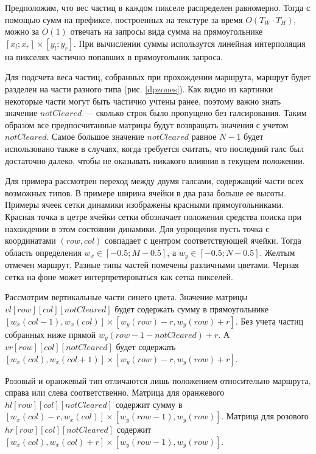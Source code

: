 Предположим, что вес частиц в каждом пикселе распределен равномерно. Тогда с помощью
сумм на префиксе, построенных на текстуре за время $O(T_W \cdot T_H)$, можно за $O(1)$
отвечать на запросы вида сумма на прямоугольнике $[x_l ; x_r] \times [y_l ; y_r]$.
При вычислении суммы использутся линейная интерполяция на пикселях частично попавших
в прямоугольник запроса.


Для подсчета веса частиц, собранных при прохождении маршрута, маршрут будет разделен на
части разного типа (рис. \ref{dpzones}). Как видно из картинки некоторые части могут
быть частично учтены ранее, поэтому важно знать значение $notCleared$ --- сколько строк
было пропущено без галсирования. Таким образом все предпосчитанные матрицы будут возвращать
значения с учетом $notCleared$. Самое большое значение $notCleared$ равное $N-1$ будет
использовано также в случаях, когда требуется считать, что последний галс был
достаточно далеко, чтобы не оказывать никакого влияния в текущем положении.

Для примера рассмотрен переход между двумя галсами, содержащий части всех возможных типов.
В примере ширина ячейки в два раза больше ее высоты. Примеры ячеек сетки динамики 
изображены красными прямоугольниками. Красная точка в цетре 
ячейки сетки обозначает положения средства поиска при нахождении в этом состоянии динамики.
Для упрощения пусть точка с координатами $(row, col)$ совпадает с центром соответствующей ячейки.
Тогда область определения $w_x \in [-0.5; M-0.5]$, а $w_y \in [-0.5; N-0.5]$.
Желтым отмечен маршрут. Разные типы частей помечены различными цветами. Черная сетка на
фоне может интерпретироваться как сетка пикселей.

Рассмотрим вертикальные части синего цвета. Значение матрицы $vl[row][col][notCleared]$
будет содержать сумму в прямоугольнике
$[w_x(col-1), w_x(col)] \times [w_y(row)-r, w_y(row)+r]$. Без 
учета частиц собранных ниже прямой $w_y(row-1-notCleared) + r$. А $vr[row][col][notCleared]$
будет содержать $[w_x(col), w_x(col+1)] \times [w_y(row)-r, w_y(row)+r]$.

Розовый и оранжевый тип отличаются лишь положением относительно маршрута, справа или слева
соответственно. Матрица для оранжевого 
$hl[row][col][notCleared]$ содержит сумму в
$[w_x(col)-r, w_x(col)] \times [w_y(row-1), w_y(row)]$. Матрица для розового
$hr[row][col][notCleared]$ содержит $[w_x(col), w_x(col)+r] \times [w_y(row-1), w_y(row)]$.


